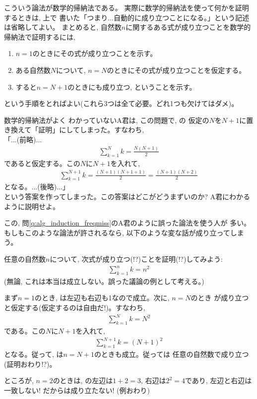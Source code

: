 こういう論法が数学的帰納法である。
実際に数学的帰納法を使って何かを証明するときは, 上で
書いた「つまり...自動的に成り立つことになる。」という記述は省略してよい。
まとめると, 自然数$n$に関するある式が成り立つことを数学的帰納法で証明するには, 
\begin{enumerate}
\item $n=1$のときにその式が成り立つことを示す。
\item ある自然数$N$について, $n=N$のときにその式が成り立つことを仮定する。
\item すると$n=N+1$のときにも成り立つ, ということを示す。
\end{enumerate}
という手順をとればよい(これら3つは全て必要。どれ1つも欠けてはダメ)。\hv

\begin{q}\label{q:alg_induction_freqmiss} 数学的帰納法がよく
わかっていないA君は, この問題で, の
仮定の$N$を$N+1$に置き換えて「証明」にしてしまった。すなわち, \\
「...(前略)...
\begin{eqnarray*}
\sum_{k=1}^N k=\frac{N(N+1)}{2}
\end{eqnarray*}
であると仮定する。この$N$に$N+1$を入れて, 
\begin{eqnarray*}
\sum_{k=1}^{N+1} k=\frac{(N+1)(N+1+1)}{2}=\frac{(N+1)(N+2)}{2}
\end{eqnarray*}
となる。...(後略)...」\\
という答案を作ってしまった。この答案はどこがどうまずいのか? 
A君にわかるように説明せよ。\end{q}

この, 問\ref{q:alg_induction_freqmiss}のA君のように誤った論法を使う人が
多い。もしもこのような論法が許されるなら, 以下のような変な話が成り立ってしまう。

\begin{exmpl} 任意の自然数$n$について, 次式が成り立つ(!?)ことを証明(!?)してみよう:
\begin{eqnarray}
\sum_{k=1}^{n} k=n^2\label{eq:wrongeq0}
\end{eqnarray}
(無論, これは本当は成立しない。誤った議論の例として考える。)

まず$n=1$のとき, は左辺も右辺も1なので成立。次に, $n=N$のとき
が成り立つと仮定する(仮定するのは自由だ!)。すなわち, 
\begin{eqnarray}
\sum_{k=1}^{N} k=N^2\label{eq:wrongeq01}
\end{eqnarray}
である。この$N$に$N+1$を入れて, 
\begin{eqnarray}
\sum_{k=1}^{N+1} k=(N+1)^2\label{eq:wrongeq02}
\end{eqnarray}
となる。従って, は$n=N+1$のときも成立。従っては
任意の自然数で成り立つ(証明おわり!?)。

ところが, $n=2$のときは, の左辺は$1+2=3$, 右辺は$2^2=4$であり, 
左辺と右辺は一致しない! だからは成り立たない!
(例おわり)\end{exmpl}

